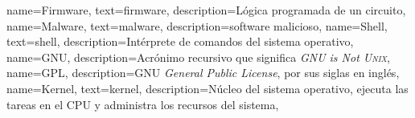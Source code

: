 {
  name={Firmware},
  text={firmware},
  description={L\'{o}gica programada de un circuito},
}
{
  name={Malware},
  text={malware},
  description={\Gls{software} malicioso},
}
{
  name={Shell},
  text={shell},
  description={Int\'{e}rprete de comandos del sistema operativo},
}
{
  name={GNU},
  description={Acr\'{o}nimo recursivo que significa \textit{GNU is Not \textsc{Unix}}},
}
{
  name={GPL},
  description={\gls{GNU} \textit{General Public License}, por sus siglas en ingl\'{e}s},
}
{
  name=Kernel,
  text=kernel,
  description={N\'{u}cleo del sistema operativo, ejecuta las tareas en el CPU y administra los recursos del sistema},
}

